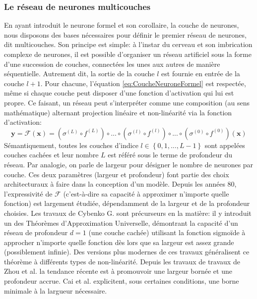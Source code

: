 \subsubsection{Le réseau de neurones multicouches}
En ayant introduit le neurone formel et son corollaire, la couche de neurones, nous disposons des bases nécessaires pour définir le premier réseau de neurones, dit multicouches. Son principe est simple: à l'instar du cerveau et son imbrication complexe de neurones, il est possible d'organiser un réseau artificiel sous la forme d'une succession de couches, connectées les unes aux autres de manière séquentielle. Autrement dit, la sortie de la couche $l$ est fournie en entrée de la couche $l+1$. Pour chacune, l'équation \ref{eq:CoucheNeuroneFormel} est respectée, même si chaque couche peut disposer d'une fonction d'activation qui lui est propre. Ce faisant, un réseau peut s'interpréter comme une composition (au sens mathématique) alternant projection linéaire et non-linéarité via la fonction d'activation:
\begin{equation}
	\mathbf{y} = \mathcal{F}(\mathbf{x}) = (\sigma^{(L)} \circ f^{(L)}) \circ ...\circ(\sigma^{(l)} \circ f^{(l)}) \circ ... \circ(\sigma^{(0)} \circ f^{(0)})(\mathbf{x}) 
\end{equation}
Sémantiquement, toutes les couches d'indice $l \in \left\lbrace 0, 1, ..., L-1\right\rbrace $ sont appelées couches cachées et leur nombre $L$ est référé sous le terme de profondeur du réseau. Par analogie, on parle de largeur pour désigner le nombre de neurones par couche. Ces deux paramètres (largeur et profondeur) font partie des choix architecturaux à faire dans la conception d'un modèle. Depuis les années 80, l'expressivité de $\mathcal{F}$ (c'est-à-dire sa capacité à approximer n'importe quelle fonction) est largement étudiée, dépendamment de la largeur et de la profondeur choisies. Les travaux de Cybenko G. sont précurseurs en la matière: il y introduit un des Théorèmes d'Approximation Universelle, démontrant la capacité d'un réseau de profondeur $d=1$ (une couche cachée) utilisant la fonction sigmoïde à approcher n'importe quelle fonction dès lors que sa largeur est assez grande (possiblement infinie). Des versions plus modernes de ces travaux généralisent ce théorème à différents types de non-linéarité. Depuis les travaux de travaux de Zhou et al. \cite{luExpressivePowerNeural2017} la tendance récente est à promouvoir une largeur bornée et une profondeur accrue. Cai et al. \cite{caiAchieveMinimumWidth2023a} explicitent, sous certaines conditions, une borne minimale à la largueur nécessaire.

